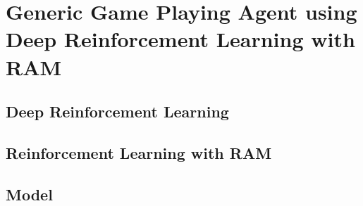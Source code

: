 \chapter{Generic Game Playing Agent using Deep Reinforcement Learning with RAM}
\section{Deep Reinforcement Learning}
\section{Reinforcement Learning with RAM}
\section{Model}